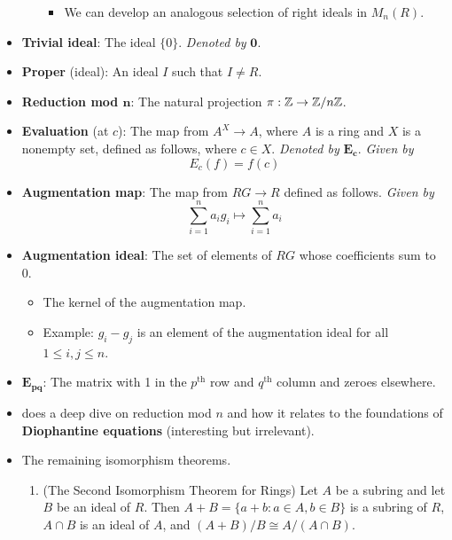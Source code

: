 \documentclass[../notes.tex]{subfiles}
\begin{document}
\begin{itemize}
\begin{enumerate}
\begin{itemize}
            \item We can develop an analogous selection of right ideals in $M_n(R)$.
        \end{itemize}
    \end{enumerate}
    \item \textbf{Trivial ideal}: The ideal $\{0\}$. \emph{Denoted by} $\bm{0}$.
    \item \textbf{Proper} (ideal): An ideal $I$ such that $I\neq R$.
    \item \textbf{Reduction mod $\bm{n}$}: The natural projection $\pi:\mathbb{Z}\to\mathbb{Z}/n\mathbb{Z}$.
    \item \textbf{Evaluation} (at $c$): The map from $A^X\to A$, where $A$ is a ring and $X$ is a nonempty set, defined as follows, where $c\in X$. \emph{Denoted by} $\bm{E_c}$. \emph{Given by}
    \begin{equation*}
        E_c(f) = f(c)
    \end{equation*}
    \item \textbf{Augmentation map}: The map from $RG\to R$ defined as follows. \emph{Given by}
    \begin{equation*}
        \sum_{i=1}^na_ig_i \mapsto \sum_{i=1}^na_i
    \end{equation*}
    \item \textbf{Augmentation ideal}: The set of elements of $RG$ whose coefficients sum to 0.
    \begin{itemize}
        \item The kernel of the augmentation map.
        \item Example: $g_i-g_j$ is an element of the augmentation ideal for all $1\leq i,j\leq n$.
    \end{itemize}
    \item $\bm{E_{pq}}$: The matrix with 1 in the $p^\text{th}$ row and $q^\text{th}$ column and zeroes elsewhere.
    \item {}\textcite{bib:DummitFoote} does a deep dive on reduction mod $n$ and how it relates to the foundations of \textbf{Diophantine equations} (interesting but irrelevant).
    \item The remaining isomorphism theorems.
    \begin{theorem}\label{trm:7.8}\leavevmode
        \begin{enumerate}[ref={\theproposition(\arabic*)}]
            \item \label{trm:7.8.1}(The Second Isomorphism Theorem for Rings) Let $A$ be a subring and let $B$ be an ideal of $R$. Then $A+B=\{a+b:a\in A,b\in B\}$ is a subring of $R$, $A\cap B$ is an ideal of $A$, and $(A+B)/B\cong A/(A\cap B)$.

\end{enumerate}
\end{theorem}
\end{itemize}
\end{document}
